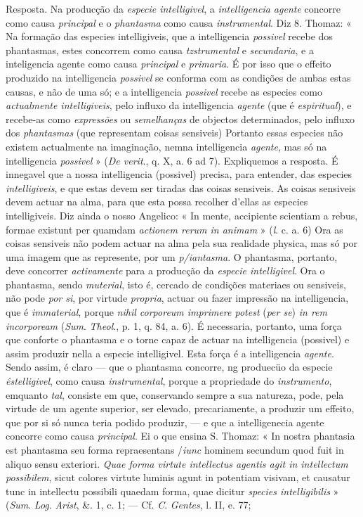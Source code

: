 Resposta. Na producção da \emph{especie intelligivel}, a \emph{intelligencia agente} concorre como causa \emph{principal} e o \emph{phantasma} como causa \emph{instrumental}. Diz 8. Thomaz: « Na formação das especies intelligiveis, que a intelligencia \emph{possivel} recebe dos phantasmas, estes concorrem como causa \emph{tzstrumental} e \emph{secundaria}, e a inteligencia agente como causa \emph{principal} e \emph{primaria}. É por isso que o effeito produzido na intelligencia \emph{possivel} se conforma com as condições de ambas estas causas, e não de uma só; e a intelligencia \emph{possivel} recebe as especies como \emph{actualmente intelligiveis}, pelo influxo da intelligencia \emph{agente} (que é \emph{espiritual}), e recebe-as como \emph{expressões} ou \emph{semelhanças} de objectos determinados, pelo influxo dos \emph{phantasmas} (que representam coisas sensiveis) Portanto essas especies não existem actualmente na imaginação, nemna intelligencia \emph{agente}, mas só na intelligencia \emph{possivel} » (\emph{De verit}., q. X, a. 6 ad 7). Expliquemos a resposta. É innegavel que a nossa intelligencia (possivel) precisa, para entender, das especies \emph{intelligiveis}, e que estas devem ser tiradas das coisas sensiveis. As coisas sensiveis devem actuar na alma, para que esta possa recolher d'ellas as especies intelligiveis. Diz ainda o nosso Angelico: « In mente, accipiente scientiam a rebus, formae existunt per quamdam \emph{actionem rerum in animam} » (\emph{l}. c. a. 6) Ora as coisas sensiveis não podem actuar na alma pela sua realidade physica, mas só por uma imagem que as represente, por um \emph{p/iantasma}. O phantasma, portanto, deve concorrer \emph{activamente} para a producção da \emph{especie intelligivel}. Ora o phantasma, sendo \emph{muterial}, isto é, cercado de condições materiaes ou sensiveis, não pode \emph{por si}, por virtude \emph{propria}, actuar ou fazer impressão na intelligencia, que é \emph{immaterial}, porque \emph{nihil corporeum imprimere potest} (\emph{per se}) \emph{in rem incorpoream} (\emph{Sum}. \emph{Theol}., p. 1, q. 84, a. 6). É necessaria, portanto, uma força que conforte o phantasma e o torne capaz de actuar na intelligencia (possivel) e assim produzir nella a especie intelligivel. Esta força é a intelligencia \emph{agente}. Sendo assim, é claro --- que o phantasma concorre, ng produecüo da especie \emph{éstelligivel}, como causa \emph{instrumental}, porque a propriedade do \emph{instrumento}, emquanto \emph{tal}, consiste em que, conservando sempre a sua natureza, pode, pela virtude de um agente superior, ser elevado, precariamente, a produzir um effeito, que por si só nunca teria podido produzir, --- e que a intelligenecia agente concorre como causa \emph{principal}. Ei o que ensina S. Thomaz: « In nostra phantasia est phantasma seu forma repraesentans /\emph{iunc} hominem secundum quod fuit in aliquo sensu exteriori. \emph{Quae forma virtute intellectus agentis agit in intellectum possibilem}, sicut colores virtute luminis agunt in potentiam visivam, et causatur tunc in intellectu possibili quaedam forma, quae dicitur \emph{species intelligibilis} » (\emph{Sum}. \emph{Log}. \emph{Arist}, \&. 1, c. 1; --- Cf. \emph{C}. \emph{Gentes}, l. II, e. 77; 